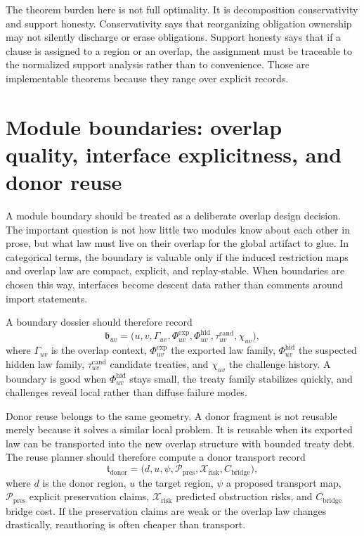 \documentclass[11pt]{report}
\begin{document}
The theorem burden here is not full optimality. It is decomposition conservativity and support honesty. Conservativity says that reorganizing obligation ownership may not silently discharge or erase obligations. Support honesty says that if a clause is assigned to a region or an overlap, the assignment must be traceable to the normalized support analysis rather than to convenience. Those are implementable theorems because they range over explicit records.

\section{Module boundaries: overlap quality, interface explicitness, and donor reuse}
A module boundary should be treated as a deliberate overlap design decision. The important question is not how little two modules know about each other in prose, but what law must live on their overlap for the global artifact to glue. In categorical terms, the boundary is valuable only if the induced restriction maps and overlap law are compact, explicit, and replay-stable. When boundaries are chosen this way, interfaces become descent data rather than comments around import statements.

A boundary dossier should therefore record
\[
\mathfrak{b}_{uv}
=
\bigl(
u,
v,
\Gamma_{uv},
\Phi^{\mathrm{exp}}_{uv},
\Phi^{\mathrm{hid}}_{uv},
\tau^{\mathrm{cand}}_{uv},
\chi_{uv}
\bigr),
\]
where $\Gamma_{uv}$ is the overlap context, $\Phi^{\mathrm{exp}}_{uv}$ the exported law family, $\Phi^{\mathrm{hid}}_{uv}$ the suspected hidden law family, $\tau^{\mathrm{cand}}_{uv}$ candidate treaties, and $\chi_{uv}$ the challenge history. A boundary is good when $\Phi^{\mathrm{hid}}_{uv}$ stays small, the treaty family stabilizes quickly, and challenges reveal local rather than diffuse failure modes.

Donor reuse belongs to the same geometry. A donor fragment is not reusable merely because it solves a similar local problem. It is reusable when its exported law can be transported into the new overlap structure with bounded treaty debt. The reuse planner should therefore compute a donor transport record
\[
\mathfrak{t}_{\mathrm{donor}}
=
\bigl(
d,
u,
\psi,
\mathcal{P}_{\mathrm{pres}},
\mathcal{X}_{\mathrm{risk}},
C_{\mathrm{bridge}}
\bigr),
\]
where $d$ is the donor region, $u$ the target region, $\psi$ a proposed transport map, $\mathcal{P}_{\mathrm{pres}}$ explicit preservation claims, $\mathcal{X}_{\mathrm{risk}}$ predicted obstruction risks, and $C_{\mathrm{bridge}}$ bridge cost. If the preservation claims are weak or the overlap law changes drastically, reauthoring is often cheaper than transport.
\end{document}
